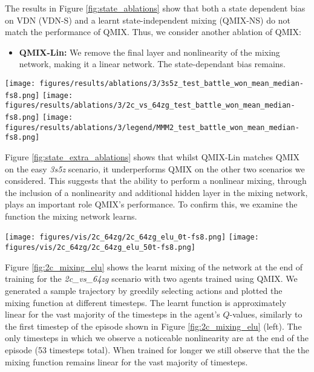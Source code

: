 \documentclass[twoside,11pt]{article}
\begin{document}
The results in Figure \ref{fig:state_ablations} show that both a state dependent bias on VDN (VDN-S) and a learnt state-independent mixing (QMIX-NS) do not match the performance of QMIX. 
Thus, we consider another ablation of QMIX:

\begin{itemize}
    \item \textbf{QMIX-Lin:} We remove the final layer and nonlinearity of the mixing network, making it a linear network. The state-dependant bias remains.
\end{itemize}

\begin{figure*}[h!]
    \centering
    \texttt{[image: figures/results/ablations/3/3s5z\_test\_battle\_won\_mean\_median-fs8.png]}
    \texttt{[image: figures/results/ablations/3/2c\_vs\_64zg\_test\_battle\_won\_mean\_median-fs8.png]}
    \texttt{[image: figures/results/ablations/3/legend/MMM2\_test\_battle\_won\_mean\_median-fs8.png]}
    \caption{Ablations for mixing network linearity experiments.}
    \label{fig:state_extra_ablations}
\end{figure*}

Figure \ref{fig:state_extra_ablations} shows that whilst QMIX-Lin matches QMIX 
on the easy \textit{3s5z} scenario, it underperforms QMIX on the other two 
scenarios we considered.
This suggests that the ability to perform a nonlinear mixing, through the inclusion of a nonlinearity and additional hidden layer in the mixing network, plays an important role QMIX's performance.
To confirm this, we examine the function the mixing network learns.

\begin{figure*}[h!]
    \centering
    \texttt{[image: figures/vis/2c\_64zg/2c\_64zg\_elu\_0t-fs8.png]}
    \texttt{[image: figures/vis/2c\_64zg/2c\_64zg\_elu\_50t-fs8.png]}
    \caption{The learnt mixing of QMIX on \textit{2c\_vs\_64zg} at the end of training for timesteps 0 (left) and 50 (right). Circles indicate the $Q_{tot}$-values for the discrete joint-action space.}
    \label{fig:2c_mixing_elu}
\end{figure*}

Figure \ref{fig:2c_mixing_elu} shows the learnt mixing of the network at the end of training for the \textit{2c\_vs\_64zg} scenario with two agents trained using QMIX.
We generated a sample trajectory by greedily selecting actions and plotted the mixing function at different timesteps.
The learnt function is approximately linear for the vast majority of the timesteps 
in the agent's $Q$-values, similarly to the first timestep of the episode shown in Figure \ref{fig:2c_mixing_elu} (left).
The only timesteps in which we observe a noticeable
nonlinearity are at the end of the episode (53 timesteps total). 
When trained for longer we still observe that the the mixing function remains linear for the vast majority of timesteps. 
\end{document}
